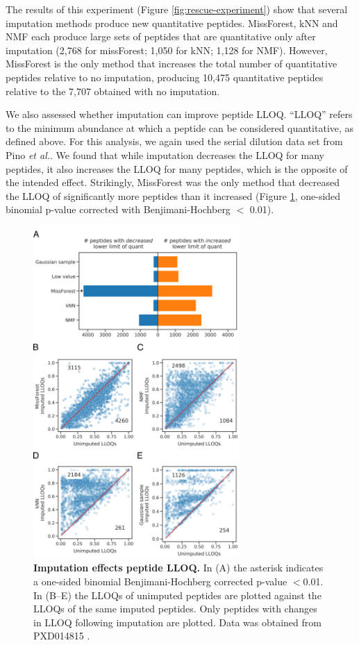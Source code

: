 \documentclass{article}
\begin{document}
The results of this experiment (Figure \ref{fig:rescue-experiment}) show that several imputation methods produce new quantitative peptides. MissForest, kNN and NMF each produce large sets of peptides that are quantitative only after imputation (2,768 for missForest; 1,050 for kNN; 1,128 for NMF). However, MissForest is the only method that increases the total number of quantitative peptides relative to no imputation, producing 10,475 quantitative peptides relative to the 7,707 obtained with no imputation. 

We also assessed whether imputation can improve peptide LLOQ. ``LLOQ'' refers to the minimum abundance at which a peptide can be considered quantitative, as defined above. For this analysis, we again used the serial dilution data set from Pino \textit{et al.}. We found that while imputation decreases the LLOQ for many peptides, it also increases the LLOQ for many peptides, which is the opposite of the intended effect. Strikingly, MissForest was the only method that decreased the LLOQ of significantly more peptides than it increased (Figure \ref{fig:lloq}, one-sided binomial p-value corrected with Benjimani-Hochberg $<$ 0.01).  

\begin{figure}
  \centering
  \includegraphics[width=0.7\textwidth]{figures/LLOQ-figure-multipanel-export4.png}
  \caption{{\bf Imputation effects peptide LLOQ.}  In (A) the asterisk indicates a one-sided binomial Benjimani-Hochberg corrected p-value $<$0.01. In (B--E) the LLOQs of unimputed peptides are plotted against the LLOQs of the same imputed peptides. Only peptides with changes in LLOQ following imputation are plotted. Data was obtained from PXD014815 \cite{matrix-matched-calib}.}
  \label{fig:lloq}
\end{figure}
\end{document}
